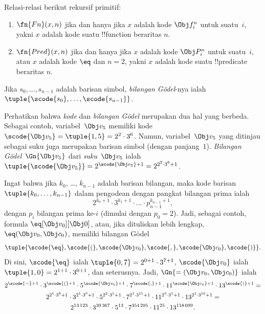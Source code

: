 \documentclass[../../../include/open-logic-section]{subfiles}
\begin{document}
\begin{prop}
Relasi-relasi berikut rekursif primitif:
\begin{enumerate}
\item $\fn{Fn}(x, n)$ jika dan hanya jika $x$ adalah kode $\Obj f^n_i$ untuk
  suatu~$i$, yakni $x$ adalah kode suatu !!{function} beraritas $n$.
\item $\fn{Pred}(x, n)$ jika dan hanya jika $x$ adalah kode $\Obj P^n_i$ untuk
  suatu~$i$, atau $x$ adalah kode $\eq$ dan $n = 2$, yakni $x$ adalah kode
  suatu !!{predicate} beraritas $n$.
\end{enumerate}
\end{prop}

\begin{defn}
Jika $s_0, \dots, s_{n-1}$ adalah barisan simbol, \emph{bilangan
  G\"odel}-nya ialah $\tuple{\scode{s_0}, \dots, \scode{s_{n-1}}}$.
\end{defn}

\begin{explain}
Perhatikan bahwa \emph{kode} dan \emph{bilangan G\"odel} merupakan dua hal
yang berbeda. Sebagai contoh, variabel~$\Obj v_5$ memiliki kode~$\scode{\Obj
  v_5} = \tuple{1, 5} = 2^2\cdot 3^6$. Namun, variabel~$\Obj v_5$ yang
ditinjau sebagai suku juga merupakan barisan simbol (dengan panjang~$1$).
\emph{Bilangan G\"odel}~$\Gn{\Obj v_5}$ dari \emph{suku}~$\Obj v_5$ ialah
$\tuple{\scode{\Obj v_5}} = 2^{\scode{\Obj v_5} + 1} =
2^{2^2\cdot 3^6 + 1}$.
\end{explain}

\begin{ex}
Ingat bahwa jika $k_0$, \dots, $k_{n-1}$ adalah barisan bilangan, maka kode
barisan $\tuple{k_0, \dots, k_{n-1}}$ dalam pengodean dengan pangkat bilangan
prima ialah
\[
2^{k_0+1}\cdot3^{k_1+1}\cdot \dots \cdot p_{n-1}^{k_{n-1}+1},
\]
dengan $p_i$ bilangan prima ke-$i$ (dimulai dengan $p_0 = 2$). Jadi, sebagai
contoh, formula $\eq[\Obj v_0][\Obj 0]$, atau, jika dituliskan lebih lengkap,
${\eq}(\Obj v_0,\Obj c_0)$, memiliki bilangan G\"odel
\[
\tuple{\scode{\eq},\scode{(},\scode{\Obj v_0},\scode{,}, \scode{\Obj
    c_0},\scode{)}}.
\]
Di sini, $\scode{\eq}$ ialah $\tuple{0,7} = 2^{0+1}\cdot
3^{7+1}$, $\scode{\Obj v_0}$ ialah $\tuple{1,0} = 2^{1+1}\cdot3^{0+1}$,
dan seterusnya. Jadi, $\Gn{=(\Obj v_0,\Obj c_0)}$ ialah
\begin{multline*}
2^{\scode{=} + 1}\cdot 3^{\scode{(}+1}\cdot 5^{\scode{\Obj v_0}+1}
\cdot 7^{\scode{,} + 1} \cdot 11^{\scode{\Obj c_0}+1} \cdot
13^{\scode{)}+1} = \\
2^{2^1\cdot 3^8 + 1}\cdot 3^{2^1\cdot 3^9+1}\cdot 5^{2^2\cdot 3^1+1}
\cdot 7^{2^1\cdot 3^{11} + 1} \cdot 11^{2^3\cdot3^1+1} \cdot
13^{2^1\cdot3^{10}+1} = \\
2^{13\,123}\cdot 3^{39\,367}\cdot 5^{13}\cdot 7^{354\,295}\cdot11^{25}\cdot13^{118\,099}.
\end{multline*}
\end{ex}
\end{document}
